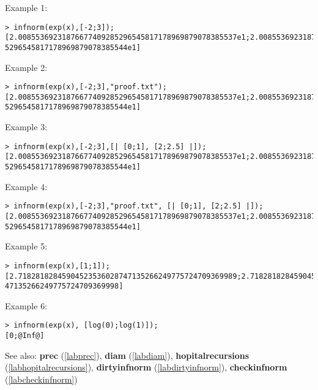 \noindent Example 1: 
\begin{center}\begin{minipage}{15cm}\begin{Verbatim}[frame=single]
> infnorm(exp(x),[-2;3]);
[2.00855369231876677409285296545817178969879078385537e1;2.0085536923187667740928
5296545817178969879078385544e1]
\end{Verbatim}
\end{minipage}\end{center}
\noindent Example 2: 
\begin{center}\begin{minipage}{15cm}\begin{Verbatim}[frame=single]
> infnorm(exp(x),[-2;3],"proof.txt");
[2.00855369231876677409285296545817178969879078385537e1;2.0085536923187667740928
5296545817178969879078385544e1]
\end{Verbatim}
\end{minipage}\end{center}
\noindent Example 3: 
\begin{center}\begin{minipage}{15cm}\begin{Verbatim}[frame=single]
> infnorm(exp(x),[-2;3],[| [0;1], [2;2.5] |]);
[2.00855369231876677409285296545817178969879078385537e1;2.0085536923187667740928
5296545817178969879078385544e1]
\end{Verbatim}
\end{minipage}\end{center}
\noindent Example 4: 
\begin{center}\begin{minipage}{15cm}\begin{Verbatim}[frame=single]
> infnorm(exp(x),[-2;3],"proof.txt", [| [0;1], [2;2.5] |]);
[2.00855369231876677409285296545817178969879078385537e1;2.0085536923187667740928
5296545817178969879078385544e1]
\end{Verbatim}
\end{minipage}\end{center}
\noindent Example 5: 
\begin{center}\begin{minipage}{15cm}\begin{Verbatim}[frame=single]
> infnorm(exp(x),[1;1]);
[2.71828182845904523536028747135266249775724709369989;2.718281828459045235360287
47135266249775724709369998]
\end{Verbatim}
\end{minipage}\end{center}
\noindent Example 6: 
\begin{center}\begin{minipage}{15cm}\begin{Verbatim}[frame=single]
> infnorm(exp(x), [log(0);log(1)]);
[0;@Inf@]
\end{Verbatim}
\end{minipage}\end{center}
See also: \textbf{prec} (\ref{labprec}), \textbf{diam} (\ref{labdiam}), \textbf{hopitalrecursions} (\ref{labhopitalrecursions}), \textbf{dirtyinfnorm} (\ref{labdirtyinfnorm}), \textbf{checkinfnorm} (\ref{labcheckinfnorm})
